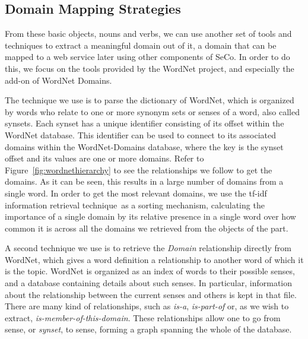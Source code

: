 
\subsection{Domain Mapping Strategies} %
\label{sub:domain_mapping_strategies}

From these basic objects, nouns and verbs, we can use another set of tools and techniques to extract a meaningful domain out of it, a domain that can be mapped to a web service later using other components of SeCo. In order to do this, we focus on the tools provided by the WordNet project, and especially the add-on of WordNet Domains.

The technique we use is to parse the dictionary of WordNet, which is organized by words who relate to one or more synonym sets or senses of a word, also called synsets. Each synset has a unique identifier consisting of its offset within the WordNet database. This identifier can be used to connect to its associated domains within the WordNet-Domains database, where the key is the synset offset and its values are one or more domains. Refer to Figure~\ref{fig:wordnethierarchy} to see the relationships we follow to get the domains. As it can be seen, this results in a large number of domains from a single word. In order to get the most relevant domains, we use the tf-idf information retrieval technique\cite{Jones72astatistical}\ as a sorting mechanism, calculating the importance of a single domain by its relative presence in a single word over how common it is across all the domains we retrieved from the objects of the part.

A second technique we use is to retrieve the \emph{Domain} relationship directly from WordNet, which gives a word definition a relationship to another word of which it is the topic. WordNet is organized as an index of words to their possible senses, and a database containing details about such senses. In particular, information about the relationship between the current senses and others is kept in that file. There are many kind of relationships, such as \emph{is-a}, \emph{is-part-of} or, as we wish to extract, \emph{is-member-of-this-domain}. These relationships allow one to go from sense, or \emph{synset}, to sense, forming a graph spanning the whole of the database.

